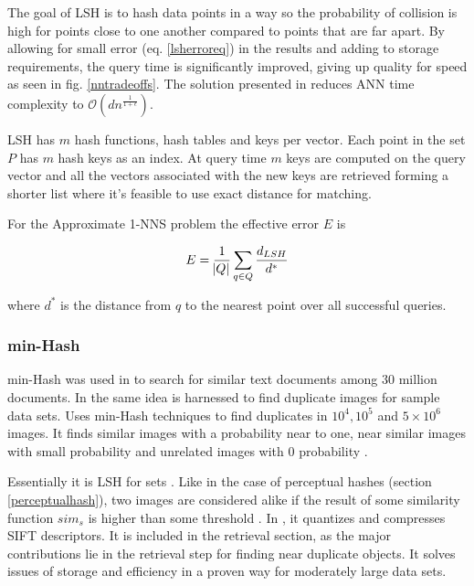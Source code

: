\documentclass[english,12pt,a4paper,pdftex,elec,utf8]{aaltothesis}
\begin{document}
The goal of LSH is to hash data points in a way so the probability of collision is high for points close to one another compared to points that are far apart. By allowing for small error (eq. \ref{lsherroreq}) in the results and adding to storage requirements, the query time is significantly improved, giving up quality for speed as seen in fig. \ref{nntradeoffs}. \cite{Gionis1999} The solution presented in \cite{Gionis1999} reduces ANN time complexity to $\mathcal{O}(dn^{\frac{1}{1+\epsilon}})$.

LSH has $m$ hash functions, hash tables and keys per vector. Each point in the set $P$ has $m$ hash keys as an index. At query time $m$ keys are computed on the query vector and all the vectors associated with the new keys are retrieved forming a shorter list where it's feasible to use exact distance for matching.





For the Approximate 1-NNS problem the effective error $E$ is

\begin{equation}
  \label{lsherroreq}
E = \frac{1}{\abs{Q}}\sum_{q\in Q}\frac{d_{LSH}}{d^*}
  \end{equation}

where $d^*$ is the distance from $q$ to the nearest point over all successful queries.


\subsubsection{min-Hash}
min-Hash was used in \cite{Broder1997} to search for similar text documents among 30 million documents. In \cite{Chum2008} the same idea is harnessed to find duplicate images for sample data sets. \cite{Chum2010} Uses min-Hash techniques to find duplicates in $10^4, 10^5$ and $5 \times 10^6$ images. It finds similar images with a probability near to one, near similar images with small probability and unrelated images with 0 probability \cite{Chum2010}.

Essentially it is LSH for sets \cite{Chum2010}. Like in the case of perceptual hashes (section \ref{perceptualhash}), two images are considered alike if the result of some similarity function $sim_s$ is higher than some threshold \cite{Chum2008}. In \cite{Chum2008}, it quantizes and compresses SIFT descriptors. It is included in the retrieval section, as the major contributions lie in the retrieval step for finding near duplicate objects. It solves issues of storage and efficiency in a proven way for moderately large data sets.
\end{document}
